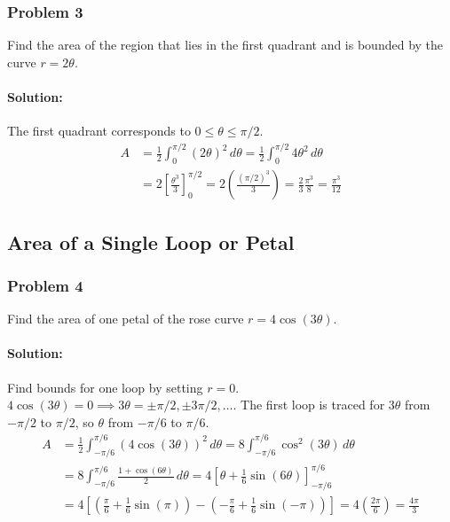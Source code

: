 \documentclass{article}
\begin{document}
\subsubsection*{Problem 3}
Find the area of the region that lies in the first quadrant and is bounded by the curve $r = 2\theta$.
\paragraph{Solution:}
The first quadrant corresponds to $0 \le \theta \le \pi/2$.
\begin{align*} A &= \frac{1}{2} \int_{0}^{\pi/2} (2\theta)^2 \,d\theta = \frac{1}{2} \int_{0}^{\pi/2} 4\theta^2 \,d\theta \\ &= 2 \left[\frac{\theta^3}{3}\right]_{0}^{\pi/2} = 2 \left(\frac{(\pi/2)^3}{3}\right) = \frac{2}{3} \frac{\pi^3}{8} = \frac{\pi^3}{12} \end{align*}


\subsection*{Area of a Single Loop or Petal}

\subsubsection*{Problem 4}
Find the area of one petal of the rose curve $r = 4\cos(3\theta)$.
\paragraph{Solution:}
Find bounds for one loop by setting $r=0$. $4\cos(3\theta) = 0 \implies 3\theta = \pm \pi/2, \pm 3\pi/2, \dots$.
The first loop is traced for $3\theta$ from $-\pi/2$ to $\pi/2$, so $\theta$ from $-\pi/6$ to $\pi/6$.
\begin{align*} A &= \frac{1}{2} \int_{-\pi/6}^{\pi/6} (4\cos(3\theta))^2 \,d\theta = 8 \int_{-\pi/6}^{\pi/6} \cos^2(3\theta) \,d\theta \\ &= 8 \int_{-\pi/6}^{\pi/6} \frac{1 + \cos(6\theta)}{2} \,d\theta = 4 \left[\theta + \frac{1}{6}\sin(6\theta)\right]_{-\pi/6}^{\pi/6} \\ &= 4 \left[\left(\frac{\pi}{6} + \frac{1}{6}\sin(\pi)\right) - \left(-\frac{\pi}{6} + \frac{1}{6}\sin(-\pi)\right)\right] = 4 \left(\frac{2\pi}{6}\right) = \frac{4\pi}{3} \end{align*}
\end{document}
